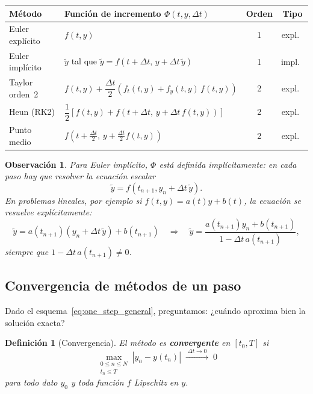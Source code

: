 \documentclass[a4paper,11pt]{report}
\newtheorem{definition}[theorem]{Definición}
\newtheorem{remark}[theorem]{Observación}
\begin{document}
\bigskip
\begin{center}
\begin{tabular}{@{}llcc@{}}
\toprule
\textbf{Método} & \textbf{Función de incremento $\Phi(t,y,\Delta t)$} & \textbf{Orden} & \textbf{Tipo} \\
\midrule
Euler explícito & $f(t,y)$ & 1 & expl.\ \\[4pt]
Euler implícito & $\tilde{y}$ tal que $\tilde{y}=f\!\left(t+\Delta t,\,y+\Delta t\,\tilde{y}\right)$ & 1 & impl.\ \\[4pt]
Taylor orden~2  & $f(t,y)+\dfrac{\Delta t}{2}\!\left(f_t(t,y)+f_y(t,y)\,f(t,y)\right)$ & 2 & expl.\ \\[8pt]
Heun (RK2)      & $\dfrac{1}{2}\!\left[f(t,y)+f\!\left(t+\Delta t,\,y+\Delta t\,f(t,y)\right)\right]$ & 2 & expl.\ \\[6pt]
Punto medio     & $f\!\left(t+\tfrac{\Delta t}{2},\,y+\tfrac{\Delta t}{2}f(t,y)\right)$ & 2 & expl.\ \\[4pt]
\bottomrule
\end{tabular}
\end{center}
\bigskip

\begin{remark}
Para Euler implícito, $\Phi$ está definida \emph{implícitamente}: en cada paso hay que resolver la ecuación escalar
\[
  \tilde y = f(t_{n+1}, y_n+\Delta t\,\tilde y).
\]
En problemas lineales, por ejemplo si $f(t,y)=a(t)y+b(t)$, la ecuación se resuelve explícitamente:
\[
  \tilde y = a(t_{n+1})(y_n+\Delta t\,\tilde y)+b(t_{n+1})
  \quad\Longrightarrow\quad
  \tilde y = \frac{a(t_{n+1})y_n+b(t_{n+1})}{1-\Delta t\,a(t_{n+1})},
\]
siempre que $1-\Delta t\,a(t_{n+1})\neq0$.
\end{remark}

\subsection{Convergencia de métodos de un paso}\label{sec:conv_pvi_new}

Dado el esquema~\eqref{eq:one_step_general}, preguntamos: ¿cuándo aproxima bien la solución exacta?

\begin{definition}[Convergencia]\label{def:conv_pvi_new}
El método es \textbf{convergente} en $[t_0,T]$ si
\[
  \max_{\substack{0\le n\le N\\t_n\le T}}|y_n-y(t_n)|\;\xrightarrow{\;\Delta t\to0\;}\;0
\]
para todo dato $y_0$ y toda función $f$ Lipschitz en $y$.
\end{definition}
\end{document}

